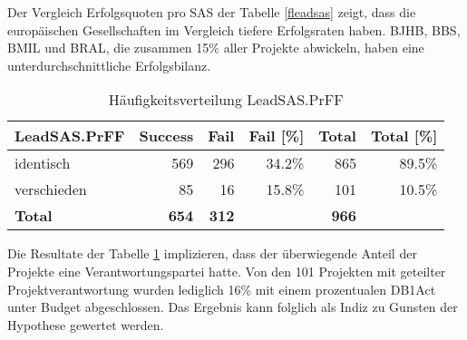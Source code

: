 Der Vergleich Erfolgsquoten pro SAS der Tabelle \ref{fleadsas} zeigt, dass die europäischen Gesellschaften im Vergleich tiefere Erfolgsraten haben. BJHB, BBS, BMIL und BRAL, die zusammen 15\% aller Projekte abwickeln, haben eine unterdurchschnittliche Erfolgsbilanz.
\begin{table}[H]
	\centering
	\caption{Häufigkeitsverteilung LeadSAS.PrFF}
	\begin{tabular}{lrrrrr}
		\textbf{LeadSAS.PrFF} & \multicolumn{1}{l}{\textbf{Success}} & \multicolumn{1}{l}{\textbf{Fail}} & \multicolumn{1}{l}{\textbf{Fail [\%]}} & \multicolumn{1}{l}{\textbf{Total}} & \multicolumn{1}{l}{\textbf{Total [\%]}}
		\\\hline
		identisch    & 569   & 296   & 34.2\% & 865 & 89.5\% \\
		verschieden   & 85    & 16    & 15.8\% & 101 & 10.5\% \\\hline
		\textbf{Total} & \textbf{654} & \textbf{312} &       & \textbf{966} \\
	\end{tabular}%
	\label{fleadsasprff}%
\end{table}%
Die Resultate der Tabelle \ref{fleadsasprff} implizieren, dass der überwiegende Anteil der Projekte eine Verantwortungspartei hatte. Von den 101 Projekten mit geteilter Projektverantwortung wurden lediglich 16\% mit einem prozentualen DB1Act unter Budget abgeschlossen. Das Ergebnis kann folglich als Indiz zu Gunsten der Hypothese gewertet werden.
